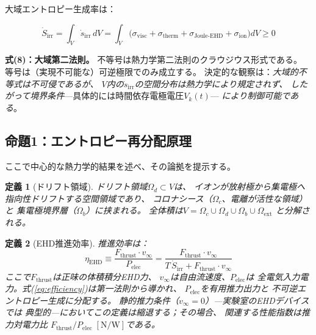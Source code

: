 \documentclass[12pt,twocolumn]{ltjsarticle}
\newtheorem{definition}{定義}
\newcommand{\Sdot}{\dot{S}_{\mathrm{irr}}}
\newcommand{\sdot}{\dot{s}_{\mathrm{irr}}}
\begin{document}
大域エントロピー生成率は：

\begin{equation}
\boxed{
  \Sdot = \int_V \sdot \, dV
  = \int_V \bigl(
    \sigma_{\mathrm{visc}}
    + \sigma_{\mathrm{therm}}
    + \sigma_{\mathrm{Joule\text{-}EHD}}
    + \sigma_{\mathrm{ion}}
  \bigr) dV \geq 0
}
\tag{8}
\label{eq:entropy_global}
\end{equation}

\noindent
\textbf{式(8)：大域第二法則。} 不等号は熱力学第二法則のクラウジウス形式である。
等号は（実現不可能な）可逆極限でのみ成立する。
決定的な観察は：\emph{大域的不等式は不可侵であるが、
$V$内の$\sdot$の空間分布は熱力学により規定されず、
したがって境界条件}---具体的には時間依存電極電圧$V_k(t)$---
\emph{により制御可能である}。

\subsection{命題1：エントロピー再分配原理}
\label{sec:theory:theorem1}

ここで中心的な熱力学的結果を述べ、その論拠を提示する。

\begin{definition}[ドリフト領域]
\label{def:drift_region}
ドリフト領域$\Omega_d \subset V$は、
イオンが放射極から集電極へ指向性ドリフトする空間領域であり、
コロナシース（$\Omega_c$、電離が活性な領域）と
集電極境界層（$\Omega_b$）に挟まれる。
全体積は$V = \Omega_c \cup \Omega_d \cup \Omega_b \cup \Omega_{\mathrm{ext}}$
と分解される。
\end{definition}

\begin{definition}[EHD推進効率]
\label{def:efficiency}
推進効率は：
\begin{equation}
  \eta_{\mathrm{EHD}}
  \equiv \frac{F_{\mathrm{thrust}} \cdot v_{\infty}}{P_{\mathrm{elec}}}
  = \frac{F_{\mathrm{thrust}} \cdot v_{\infty}}
         {T\,\Sdot + F_{\mathrm{thrust}} \cdot v_{\infty}}
  \label{eq:efficiency}
\end{equation}
ここで$F_{\mathrm{thrust}}$は正味の体積積分EHD力、
$v_{\infty}$は自由流速度、$P_{\mathrm{elec}}$は
全電気入力電力。式(\ref{eq:efficiency})は第一法則から導かれ、
$P_{\mathrm{elec}}$を有用推力出力と
不可逆エントロピー生成に分配する。
静的推力条件（$v_{\infty} = 0$）---実験室のEHDデバイスでは
典型的---においてこの定義は縮退する；その場合、
関連する性能指数は推力対電力比
$F_{\mathrm{thrust}} / P_{\mathrm{elec}}\;[\mathrm{N/W}]$である。
\end{definition}
\end{document}
